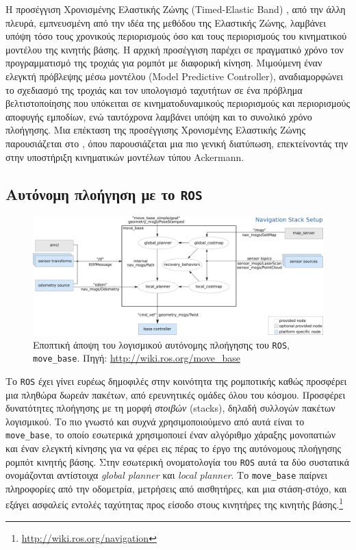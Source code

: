 Η προσέγγιση Χρονισμένης Ελαστικής Ζώνης (Timed-Elastic Band)
\cite{ChristophRoesmann}, από την άλλη πλευρά, εμπνευσμένη από την ιδέα της
μεθόδου της Ελαστικής Ζώνης, λαμβάνει υπόψη τόσο τους χρονικούς περιορισμούς
όσο και τους περιορισμούς του κινηματικού μοντέλου της κινητής βάσης. Η αρχική
προσέγγιση παρέχει σε πραγματικό χρόνο τον προγραμματισμό της τροχιάς για
ρομπότ με διαφορική κίνηση. Μιμούμενη έναν ελεγκτή πρόβλεψης μέσω μοντέλου
(Model Predictive Controller), αναδιαμορφώνει το σχεδιασμό της τροχιάς και τον
υπολογισμό ταχυτήτων σε ένα πρόβλημα βελτιστοποίησης που υπόκειται σε
κινηματοδυναμικούς περιορισμούς και περιορισμούς αποφυγής εμποδίων, ενώ
ταυτόχρονα λαμβάνει υπόψη και το συνολικό χρόνο πλοήγησης. Μια επέκταση της
προσέγγισης Χρονισμένης Ελαστικής Ζώνης παρουσιάζεται στο \cite{Rosmann2017},
όπου παρουσιάζεται μια πιο γενική διατύπωση, επεκτείνοντάς την στην υποστήριξη
κινηματικών μοντέλων τύπου Ackermann.


\subsection{Αυτόνομη πλοήγηση με το \texttt{ROS}}
\label{subsection:02_01_02:03}

\begin{figure}\centering
  \includegraphics[width=\textwidth]{./figures/parts/01/chapters/03/sections/01/move_base.png}
  \caption{\small Εποπτική άποψη του λογισμικού αυτόνομης πλοήγησης του
           \texttt{ROS}, \texttt{move\_base}. Πηγή:
           \url{http://wiki.ros.org/move\_base}}
  \label{fig:movebase}
\end{figure}

Το \texttt{ROS} έχει γίνει ευρέως δημοφιλές στην κοινότητα της ρομποτικής καθώς
προσφέρει μια πληθώρα δωρεάν πακέτων, από ερευνητικές ομάδες όλου του κόσμου.
Προσφέρει δυνατότητες πλοήγησης με τη μορφή \textit{στοιβών} (stacks), δηλαδή
συλλογών πακέτων λογισμικού. Το πιο γνωστό και συχνά χρησιμοποιούμενο από αυτά
είναι το \texttt{move\_base}, το οποίο εσωτερικά χρησιμοποιεί έναν
αλγόριθμο χάραξης μονοπατιών και έναν ελεγκτή κίνησης για να φέρει εις πέρας
το έργο της αυτόνομους πλοήγησης ρομπότ κινητής βάσης. Στην εσωτερική
ονοματολογία του \texttt{ROS} αυτά τα δύο συστατικά ονομάζονται αντίστοιχα
\textit{global planner} και \textit{local planner}. Το \texttt{move\_base}
παίρνει πληροφορίες από την οδομετρία, μετρήσεις από αισθητήρες, και μια
στάση-στόχο, και εξάγει ασφαλείς εντολές ταχύτητας προς είσοδο στους κινητήρες
της κινητής βάσης.\footnote{\url{http://wiki.ros.org/navigation}}

